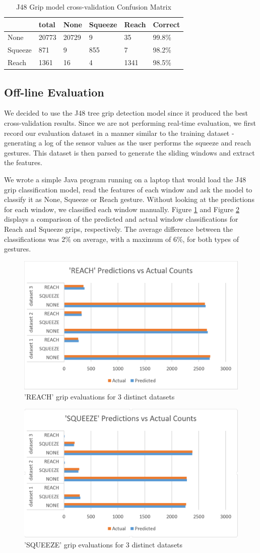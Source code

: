 \begin{table}[!t]
\caption{J48 Grip model cross-validation Confusion Matrix}
\label{tbl-Grip Model J48}
\begin{tabular}{|l|l|l|l|l|l|}
\hline
        & total & None  & Squeeze & Reach & Correct \\ \hline \hline
None    & 20773 & 20729 & 9       & 35    & 99.8\%  \\ \hline
Squeeze & 871   & 9     & 855     & 7     & 98.2\%  \\ \hline
Reach   & 1361  & 16    & 4       & 1341  & 98.5\%  \\ \hline
\end{tabular}
\end{table}


\subsection{Off-line Evaluation}
We decided to use the J48 tree grip detection model since it produced the best cross-validation results. Since we are not performing real-time evaluation, we first record our evaluation dataset in a manner similar to the training dataset - generating a log of the sensor values as the user performs the squeeze and reach gestures. This dataset is then parsed to generate the sliding windows and extract the features. 
\par
We wrote a simple Java program running on a laptop that would load the J48 grip classification model, read the features of each window and ask the model to classify it as None, Squeeze or Reach gesture. Without looking at the predictions for each window, we classified each window manually. Figure \ref{fig:reach_eval} and Figure \ref{fig:squeeze_eval} displays a comparison of the predicted and actual window classifications for Reach and Squeeze grips, respectively. The average difference between the classifications was 2\% on average, with a maximum of 6\%, for both types of gestures.


\begin{figure}[h]
\includegraphics[width=.45\textwidth]{reach_eval.png}
\caption{'REACH' grip evaluations for 3 distinct datasets}
\label{fig:reach_eval}
\end{figure}


\begin{figure}[h]
\includegraphics[width=.45\textwidth]{squeeze_eval.png}
\caption{'SQUEEZE' grip evaluations for 3 distinct datasets}
\label{fig:squeeze_eval}
\end{figure}

